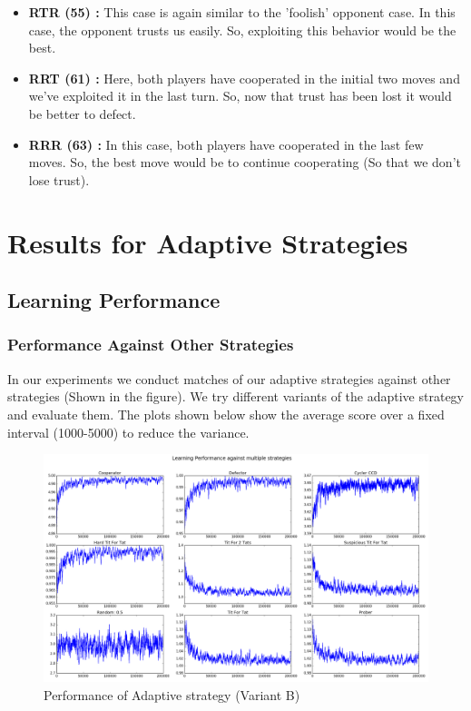 \documentclass[a4paper]{article}
\begin{document}
\begin{itemize}
	\item \textbf{RTR (55) :} This case is again similar to the 'foolish' opponent case. In this case, the opponent trusts us easily. So, exploiting this behavior would be the best.
	\item \textbf{RRT (61) :} Here, both players have cooperated in the initial two moves and we've exploited it in the last turn. So, now that trust has been lost it would be better to defect.
	\item \textbf{RRR (63) :} In this case, both players have cooperated in the last few moves. So, the best move would be to continue cooperating (So that we don't lose trust).
	\end{itemize}
	
	\section{Results for Adaptive Strategies}

	\subsection{Learning Performance}
		
	\subsubsection{Performance Against Other Strategies}
	
	In our experiments we conduct matches of our adaptive strategies against other strategies (Shown in the figure). We try different variants of the adaptive strategy and evaluate them. The plots shown below show the average score over a fixed interval (1000-5000) to reduce the variance. 
	
	\begin{figure}[H]
	\centering
	\includegraphics[width=\textwidth]{learnerB.png}
	\caption{{Performance of Adaptive strategy (Variant B)}}
	\end{figure}
\end{document}
